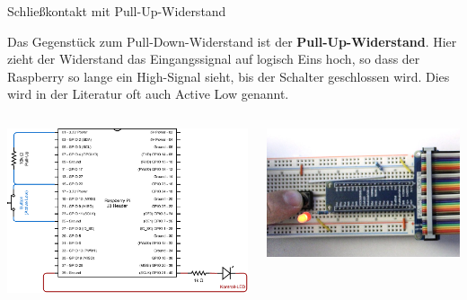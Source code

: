 {
\footnotesize

\begin{frame}{Schließkontakt mit Pull-Up-Widerstand}
    \parbox{\linewidth}{
        Das Gegenstück zum Pull-Down-Widerstand ist der \textbf{Pull-Up-Widerstand}. Hier
        zieht der Widerstand das Eingangssignal auf logisch Eins hoch, so dass der Raspberry
        so lange ein High-Signal sieht, bis der Schalter geschlossen wird. Dies wird in der
        Literatur oft auch \glqq{}Active Low\grqq{} genannt.
    }

    \bigskip

    \begin{columns}
        \includegraphics[width=\textwidth]{2-hardwaredesign/img/button_pullup_schaltplan}

        \includegraphics[width=\textwidth]{2-hardwaredesign/img/button_pullup_foto}
    \end{columns}
\end{frame}
}

